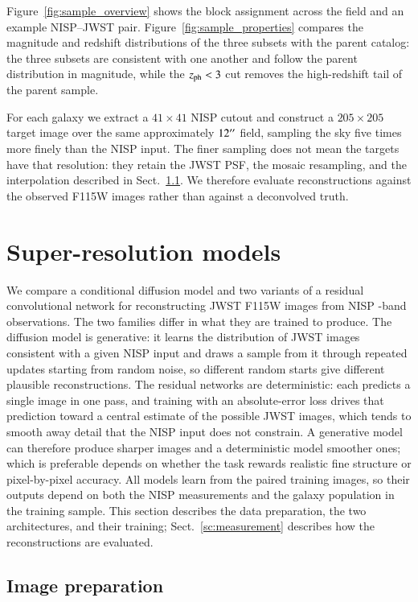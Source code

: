 \documentclass[longauth]{aa}
\begin{document}
Figure~\ref{fig:sample_overview} shows the block assignment across the field and an example NISP--JWST pair.
Figure~\ref{fig:sample_properties} compares the magnitude and redshift distributions of the three subsets with the parent catalog: the three subsets are consistent with one another and follow the parent distribution in magnitude, while the $z_{\rm ph}<3$ cut removes the high-redshift tail of the parent sample.

For each galaxy we extract a $41\times41$ NISP cutout and construct a $205\times205$ target image over the same approximately $12^{\prime\prime}$ field, sampling the sky five times more finely than the NISP input.
The finer sampling does not mean the targets have that resolution: they retain the JWST PSF, the mosaic resampling, and the interpolation described in Sect.~\ref{sc:preprocessing}.
We therefore evaluate reconstructions against the observed F115W images rather than against a deconvolved truth.

\section{\label{sc:methods}Super-resolution models}

We compare a conditional diffusion model and two variants of a residual convolutional network for reconstructing JWST F115W images from NISP \YE-band observations.
The two families differ in what they are trained to produce.
The diffusion model is generative: it learns the distribution of JWST images consistent with a given NISP input and draws a sample from it through repeated updates starting from random noise, so different random starts give different plausible reconstructions.
The residual networks are deterministic: each predicts a single image in one pass, and training with an absolute-error loss drives that prediction toward a central estimate of the possible JWST images, which tends to smooth away detail that the NISP input does not constrain.
A generative model can therefore produce sharper images and a deterministic model smoother ones; which is preferable depends on whether the task rewards realistic fine structure or pixel-by-pixel accuracy.
All models learn from the paired training images, so their outputs depend on both the NISP measurements and the galaxy population in the training sample.
This section describes the data preparation, the two architectures, and their training; Sect.~\ref{sc:measurement} describes how the reconstructions are evaluated.

\subsection{Image preparation}
\label{sc:preprocessing}
\end{document}
